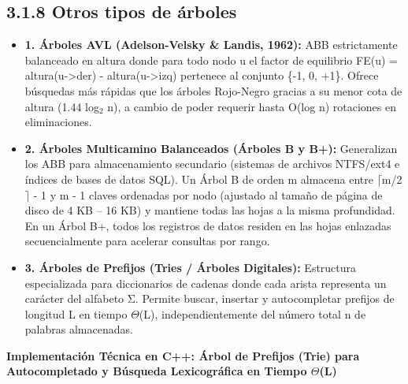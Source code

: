 \documentclass[11pt,letterpaper]{article}
\begin{document}
\subsection*{3.1.8 Otros tipos de árboles}
\begin{itemize}
\setlength{\itemsep}{2pt}\setlength{\parskip}{0pt}
  \item \textbf{1. Árboles AVL (Adelson-Velsky \& Landis, 1962): }ABB estrictamente balanceado en altura donde para todo nodo u el factor de equilibrio FE(u) = altura(u->der) - altura(u->izq) pertenece al conjunto \{-1, 0, +1\}. Ofrece búsquedas más rápidas que los árboles Rojo-Negro gracias a su menor cota de altura (1.44 log$_2$ n), a cambio de poder requerir hasta O(log n) rotaciones en eliminaciones.
  \item \textbf{2. Árboles Multicamino Balanceados (Árboles B y B+): }Generalizan los ABB para almacenamiento secundario (sistemas de archivos NTFS/ext4 e índices de bases de datos SQL). Un Árbol B de orden m almacena entre $\lceil$m/2$\rceil$ - 1 y m - 1 claves ordenadas por nodo (ajustado al tamaño de página de disco de 4 KB – 16 KB) y mantiene todas las hojas a la misma profundidad. En un Árbol B+, todos los registros de datos residen en las hojas enlazadas secuencialmente para acelerar consultas por rango.
  \item \textbf{3. Árboles de Prefijos (Tries / Árboles Digitales): }Estructura especializada para diccionarios de cadenas donde cada arista representa un carácter del alfabeto Σ. Permite buscar, insertar y autocompletar prefijos de longitud L en tiempo $\Theta$(L), independientemente del número total n de palabras almacenadas.
\end{itemize}
\vspace{4pt}\noindent\textbf{\color{ipnblue}Implementación Técnica en C++: Árbol de Prefijos (Trie) para Autocompletado y Búsqueda Lexicográfica en Tiempo $\Theta$(L)}\par\vspace{-2pt}
\end{document}
